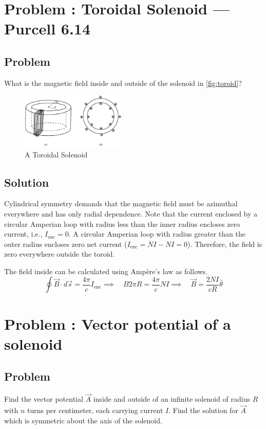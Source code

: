 \documentclass[solutions]{esg8022pset}
\begin{document}
\section{Problem \thesection: Toroidal Solenoid --- Purcell 6.14}
\subsection{Problem}
  What is the magnetic field inside and outside of the solenoid in \autoref{fig:toroid}?
  \begin{figure}[H]
    \centering
    \includegraphics[width = 5cm]{Toroid}
    \caption{A Toroidal Solenoid}
    \label{fig:toroid}
  \end{figure}
\subsection{Solution}
  Cylindrical symmetry demands that the magnetic field must be azimuthal
  everywhere and has only radial dependence.  Note that the current enclosed by
  a circular Amperian loop with radius less than the inner radius encloses zero
  current, i.e., $I_{\text{enc}} = 0$.  A circular Amperian loop with radius
  greater than the outer radius encloses zero net current ($I_{\text{enc}} = NI
  - NI = 0$). Therefore, the field is zero everywhere outside the toroid.

  The field inside can be calculated using Amp\`{e}re's law as follows.
  $$\oint \vec{B} \cdot d\vec{s} = \frac{4\pi}{c}I_{\text{enc}}  \implies \quad B 2 \pi R
  = \frac{4\pi}{c}NI  \implies \quad \vec{B} =
  \frac{2NI}{cR}\hat{\theta} $$
\section{Problem \thesection: Vector potential of a solenoid}
\subsection{Problem}
  Find the vector potential $\vec A$ inside and outside of an infinite solenoid
  of radius $R$ with $n$ turns per centimeter, each carrying current $I$.  Find
  the solution for $\vec A$ which is symmetric about the axis of the solenoid.
\end{document}
